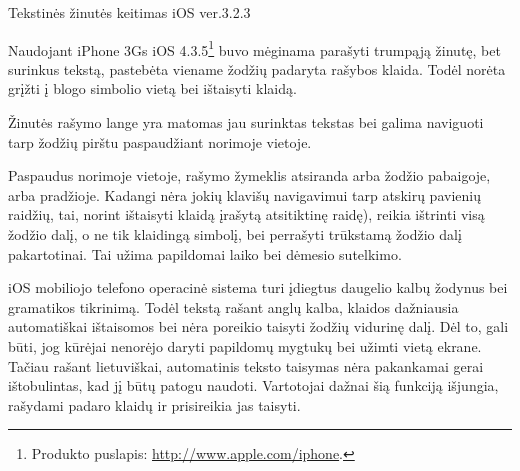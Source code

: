 \begin{xcase}{Tekstinės žinutės keitimas iOS ver.3.2.3}
  \xcgoal
  {
  	Naudojant iPhone 3Gs 
	iOS 4.3.5\footnote{Produkto puslapis: \url{http://www.apple.com/iphone}.}
	buvo mėginama parašyti trumpąją žinutę, bet surinkus tekstą, pastebėta 
	viename žodžių padaryta rašybos klaida. Todėl norėta grįžti į blogo 
	simbolio vietą bei ištaisyti klaidą.
	
  }
  
  \xctools
  {
    Žinutės rašymo lange yra matomas jau surinktas tekstas bei galima 
    naviguoti tarp žodžių pirštu paspaudžiant norimoje vietoje. 
  }
  
  \xcresult
  {
    Paspaudus norimoje vietoje, rašymo žymeklis atsiranda arba žodžio
    pabaigoje, arba pradžioje. Kadangi nėra jokių klavišų navigavimui tarp
    atskirų pavienių raidžių, tai, norint ištaisyti klaidą 
	įrašytą atsitiktinę raidę), reikia ištrinti visą žodžio dalį, o ne tik 
    klaidingą simbolį, bei perrašyti trūkstamą žodžio dalį pakartotinai. Tai 
    užima papildomai laiko bei dėmesio sutelkimo.
  }
  
  \xcprinciples
  {
  }
  
  \xcthoughts
  {
    iOS mobiliojo telefono operacinė sistema turi įdiegtus daugelio kalbų
    žodynus bei gramatikos tikrinimą. Todėl tekstą rašant anglų kalba, 
    klaidos dažniausia automatiškai ištaisomos bei nėra poreikio taisyti 
    žodžių vidurinę dalį. Dėl to, gali būti, jog kūrėjai nenorėjo daryti 
    papildomų mygtukų bei užimti vietą ekrane. 
    Tačiau rašant lietuviškai, automatinis teksto taisymas nėra pakankamai 
    gerai ištobulintas, kad jį būtų patogu naudoti. Vartotojai dažnai šią
    funkciją išjungia, rašydami padaro klaidų ir prisireikia jas taisyti.
  }
\end{xcase}
